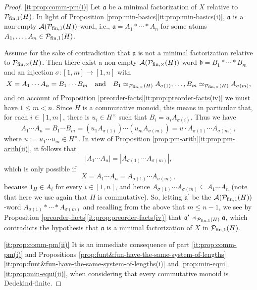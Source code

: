 \begin{proof}
	\ref{it:prop:comm-pm(i)} Let $\mathfrak{a}$ be a minimal factorization of $X$ relative to $\mathcal{P}_{\textrm{fin},1}(H)$. In light of Proposition \ref{prop:min-basics}\ref{it:prop:min-basics(i)}, $\mathfrak{a}$ is a non-empty $\mathcal{A}(\mathcal P_{\textrm{fin},1}(H))$-word, i.e., $\mathfrak a = A_1 \ast \cdots \ast A_n$ for some atoms $A_1, \ldots, A_n \in \mathcal P_{\textrm{fin},1}(H)$. 
	
	Assume for the sake of contradiction that $\mathfrak a$ is not a minimal factorization relative to $\mathcal{P}_{\textrm{fin},\times}(H)$. Then there exist a non-empty $\mathcal{A}(\mathcal P_{\textrm{fin},\times}(H))$-word $\mathfrak b = B_1 * \cdots * B_m$ and an injection $\sigma: [ 1, m ] \to [ 1, n ]$ with 
	\[
	X = A_1 \cdots A_n = B_1 \cdots B_m
	\quad\text{and}\quad
	B_1 \simeq_{\mathcal P_{\textrm{fin},\times}(H)} A_{\sigma(1)}, \ldots, B_m \simeq_{\mathcal P_{\textrm{fin},\times}(H)} A_{\sigma(m)},
	\]
	and on account of Proposition \ref{preorder-facts}\ref{it:prop:preorder-facts(iv)} we must have $1 \le m < n$.
	Since $H$ is a commutative monoid, this means in particular that, for each $i \in [ 1, m ]$, there is $u_i \in H^\times$ such that $B_i = u_i A_{\sigma(i)}$. Thus we have
	\[
	A_1 \cdots A_n = B_1 \cdots B_m = (u_1 A_{\sigma(1)}) \cdots (u_m A_{\sigma(m)}) = u \cdot A_{\sigma(1)} \cdots A_{\sigma(m)},
	\]
	where $u := u_1 \cdots u_m \in H^\times$. In view of Proposition \ref{prop:pm-arith}\ref{it:prop:pm-arith(ii)}, it follows that
	\[
	\left| A_1 \cdots A_n \right| = \left|A_{\sigma(1)} \cdots A_{\sigma(m)} \right|,
	\]
	which is only possible if 
	\[
	X = A_1 \cdots A_n = A_{\sigma(1)} \cdots A_{\sigma(m)}, 
	\]
	because $1_H \in A_i$ for every $i \in [ 1, n ]$, and hence $A_{\sigma(1)} \cdots A_{\sigma(m)} \subseteq A_1 \cdots A_n$ (note that here we use again that $H$ is commutative). So, letting $\mathfrak a^\prime$ be the $\mathcal{A}(\mathcal P_{\textrm{fin},1}(H))$-word $ A_{\sigma(1)} \ast \cdots \ast A_{\sigma(m)}$ and recalling from the above that $m \le n-1$, we see by Proposition \ref{preorder-facts}\ref{it:prop:preorder-facts(iv)} that $\mathfrak a^\prime \prec_{\mathcal P_{\textrm{fin},1}(H)} \mathfrak a$, which contradicts the hypothesis that $\mathfrak a$ is a minimal factorization of $X$ in $\mathcal P_{\textrm{fin},1}(H)$.
	
	\ref{it:prop:comm-pm(ii)} It is an immediate consequence of part \ref{it:prop:comm-pm(i)} and Propositions \ref{prop:funt&fun-have-the-same-system-of-lengths}\ref{it:prop:funt&fun-have-the-same-system-of-lengths(i)} and \ref{prop:min-equi}\ref{it:prop:min-equi(ii)}, when considering that every commutative monoid is Dedekind-finite.
	

\end{proof}
